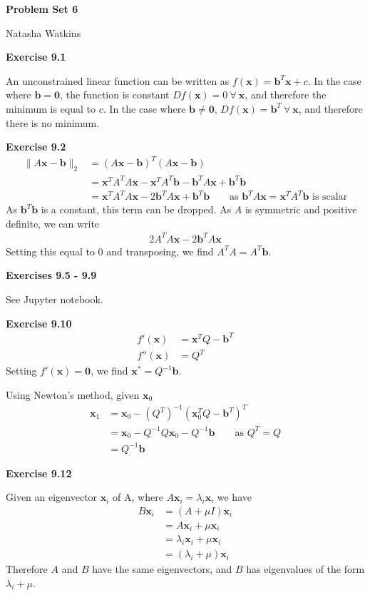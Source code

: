 \documentclass[letterpaper,12pt]{article}
\newcommand{\vect}[1]{\mathbf{#1}}
\begin{document}
\textbf{\large Problem Set 6}

Natasha Watkins

\vspace{5mm}

\textbf{Exercise 9.1}

An unconstrained linear function can be written as $f(\vect{x}) = \vect{b}^T \vect{x} + c$. In the case where $\vect{b} = \vect{0}$, the function is constant $Df(\vect{x}) = 0 \ \forall \ \vect{x}$, and therefore the minimum is equal to $c$. In the case where $\vect{b} \neq \vect{0}$, $Df(\vect{x}) = \vect{b}^T \ \forall \ \vect{x}$, and therefore there is no minimum.

\textbf{Exercise 9.2}
\begin{align*}
\| A \vect{x} - \vect{b} \|_2
&= (A \vect{x} - \vect{b})^T (A \vect{x} - \vect{b}) \\
&= \vect{x}^T A^T A \vect{x} - \vect{x}^T A^T \vect{b} - \vect{b}^T A \vect{x} + \vect{b}^T \vect{b} \\
&= \vect{x}^T A^T A \vect{x} - 2\vect{b}^T A \vect{x}  + \vect{b}^T \vect{b}
\quad \quad \text{as } \vect{b}^T A \vect{x} = \vect{x}^T A^T \vect{b} \text{ is scalar}
\end{align*}
As $\vect{b}^T \vect{b}$ is a constant, this term can be dropped. As $A$ is symmetric and positive definite, we can write
\begin{align*}
2A^T A \vect{x} - 2\vect{b}^T A \vect{x}
\end{align*}
Setting this equal to 0 and transposing, we find $A^T A = A^T \vect{b}$.


\textbf{Exercises 9.5 - 9.9}

See Jupyter notebook.

\textbf{Exercise 9.10}
\begin{align*}
f'(\vect{x}) &= \vect{x}^T Q - \vect{b}^T \\
f''(\vect{x}) &= Q^T
\end{align*}
Setting $f'(\vect{x}) = \vect{0}$, we find $\vect{x}^* = Q^{-1} \vect{b}$.

Using Newton's method, given $\vect{x}_0$
\begin{align*}
\vect{x}_1 &= \vect{x}_0 - (Q^T)^{-1} (\vect{x}_0^T Q - \vect{b}^T)^T \\
&= \vect{x}_0 - Q^{-1} Q  \vect{x}_0 - Q^{-1}\vect{b} \quad \quad \text{as } Q^T = Q \\
&= Q^{-1} \vect{b}
\end{align*}

\textbf{Exercise 9.12}

Given an eigenvector $\vect{x}_i$ of A, where $A \vect{x}_i = \lambda_i \vect{x}$, we have
\begin{align*}
B \vect{x}_i &= (A + \mu I) \vect{x}_i \\
&= A\vect{x}_i + \mu \vect{x}_i \\
&= \lambda_i \vect{x}_i + \mu \vect{x}_i \\
&= (\lambda_i + \mu) \vect{x}_i
\end{align*}
Therefore $A$ and $B$ have the same eigenvectors, and $B$ has eigenvalues of the form $\lambda_i + \mu$.
\end{document}
